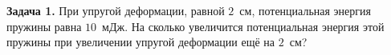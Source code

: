
\begin{taskbasic}[code={\label{task:mechanics_v9_n22_fixed}}]
\textbf{Задача 1.} При упругой деформации, равной $2$~см, потенциальная энергия пружины равна $10$~мДж. На сколько увеличится потенциальная энергия этой пружины при увеличении упругой деформации ещё на $2$~см?

\end{taskbasic}

